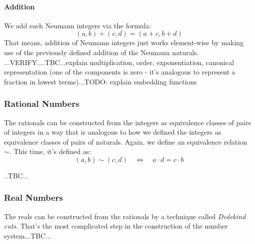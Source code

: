 \paragraph{Addition}
We add such Neumann integers via the formula:
\begin{equation}
 (a,b)+(c,d) = (a+c,b+d)
\end{equation}
That means, addition of Neumann integers just works element-wise by making use of the previously defined addition of the Neumann naturals. ...VERIFY....TBC...explain multiplication, order, exponentiation, canonical representation (one of the components is zero - it's analogous to represent a fraction in lowest terms)...TODO: explain embedding functions






\subsubsection{Rational Numbers} The rationals can be constructed from the integers as equivalence classes of pairs of integers in a way that is analogous to how we defined the integers as equivalence classes of pairs of naturals. Again, we define an equivalence relation $\sim$. This time, it's defined as:
\begin{equation}
(a,b) \sim (c,d) \quad \Leftrightarrow  \quad a \cdot d = c \cdot b
\end{equation}

..TBC...


\subsubsection{Real Numbers} The reals can be constructed from the rationals by a technique called \emph{Dedekind cuts}. That's the most complicated step in the construction of the number system...TBC...


